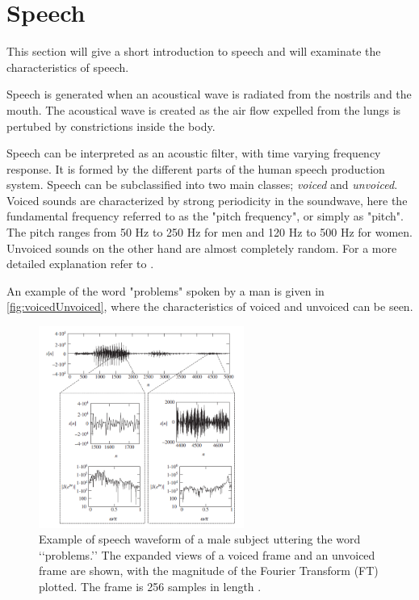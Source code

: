 \section{Speech} \label{sec:Speech}
This section will give a short introduction to speech and will examinate the characteristics of speech. 

Speech is generated when an acoustical wave is radiated from the nostrils and the mouth. The acoustical wave is created as the air flow expelled from the lungs is pertubed by constrictions inside the body. 

Speech can be interpreted as an acoustic filter, with time varying frequency response. It is formed by the different parts of the human speech production system. Speech can be subclassified into two main classes; \textit{voiced} and \textit{unvoiced}. Voiced sounds are characterized by strong periodicity in the soundwave, here the fundamental frequency referred  to as the "pitch frequency", or simply as "pitch". The pitch ranges from 50 Hz to 250 Hz for men and 120 Hz to 500 Hz for women. Unvoiced sounds on the other hand are almost completely random. For a more detailed explanation refer to \citep{Speech}. 

An example of the word "problems" spoken by a man is given in \autoref{fig:voicedUnvoiced}, where the characteristics of voiced and unvoiced can be seen. 

\begin{figure}[H]
	\centering
	\includegraphics[width=0.6\textwidth]{figures/Speech/VoicedvsUnvoiced}
	\caption{Example of speech waveform of a male subject uttering the word ‘‘problems.’’ The expanded views of a voiced frame and an unvoiced frame are shown, with the magnitude of the Fourier Transform (FT) plotted. The frame is 256 samples in length \citep{Speech}.}
	\label{fig:voicedUnvoiced}
\end{figure}   

